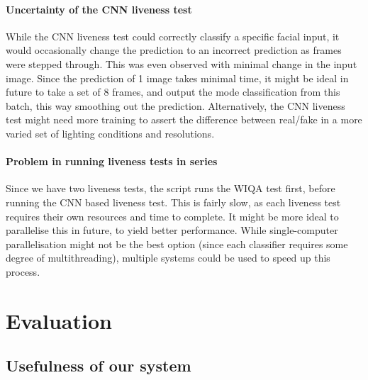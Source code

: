 \documentclass[10pt,a4paper]{article}
\begin{document}
        \paragraph{Uncertainty of the CNN liveness test}
            While the CNN liveness test could correctly classify a specific facial input, it would occasionally change the prediction to an incorrect prediction
            as frames were stepped through. This was even observed with minimal change in the input image. Since the prediction of 1 image takes minimal time,
            it might be ideal in future to take a set of 8 frames, and output the mode classification from this batch, this way smoothing out the prediction.
            Alternatively, the CNN liveness test might need more training to assert the difference between real/fake in a more varied set of lighting conditions and resolutions.

        \paragraph{Problem in running liveness tests in series}
            Since we have two liveness tests, the script runs the WIQA test first, before running the CNN based liveness test. This is fairly slow, as each liveness test requires their
            own resources and time to complete. It might be more ideal to parallelise this in future, to yield better performance. While single-computer parallelisation might not be the best option
            (since each classifier requires some degree of multithreading), multiple systems could be used to speed up this process.

\section{Evaluation}
    \subsection{Usefulness of our system}
    
\end{document}
